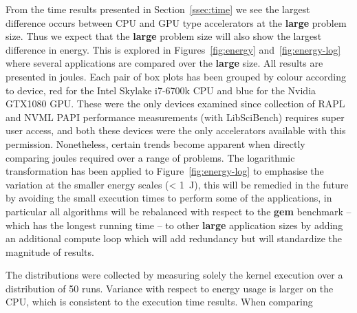 \documentclass[../document.tex]{subfiles}
\begin{document}

From the time results presented in Section~\ref{ssec:time} we see the largest difference occurs between CPU and GPU type accelerators at the {\bf large} problem size.
Thus we expect that the {\bf large} problem size will also show the largest difference in energy.
This is explored in Figures~\ref{fig:energy} and~\ref{fig:energy-log} where several applications are compared over the {\bf large} size.
All results are presented in joules.
Each pair of box plots has been grouped by colour according to device, red for the Intel Skylake i7-6700k CPU and blue for the Nvidia GTX1080 GPU.
These were the only devices examined since collection of RAPL and NVML PAPI performance measurements (with LibSciBench) requires super user access, and both these devices were the only accelerators available with this permission.
Nonetheless, certain trends become apparent when directly comparing joules required over a range of problems.
The logarithmic transformation has been applied to Figure~\ref{fig:energy-log} to emphasise the variation at the smaller energy scales (< \SI{1}{\joule}), this will be remedied in the future by avoiding the small execution times to perform some of the applications, in particular all algorithms will be rebalanced with respect to the {\bf gem} benchmark -- which has the longest running time -- to other {\bf large} application sizes by adding an additional compute loop which will add redundancy but will standardize the magnitude of results.

The distributions were collected by measuring solely the kernel execution over a distribution of 50 runs.
Variance with respect to energy usage is larger on the CPU, which is consistent to the execution time results.
When comparing 
\end{document}
